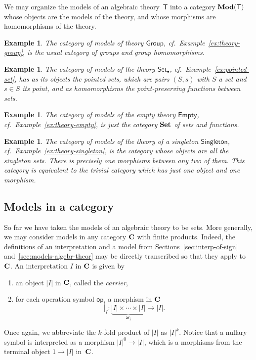 \documentclass{amsart}
\newcommand{\theory}[1]{\mathsf{#1}} %
\newcommand{\Mod}[1]{\text{\textbf{Mod}}(\theory{#1})} %
\newcommand{\category}[1]{\text{\textbf{#1}}} %
\newcommand{\op}[1]{\mathsf{op}_{#1}} %
\newcommand{\arity}[1]{\mathsf{ar}_{#1}} %
\newcommand{\one}{\mathsf{1}} %
\newcommand{\sem}[1]{[\![#1]\!]} %
\newtheorem{example}[definition]{Example}
\begin{document}
We may organize the models of an algebraic theory~$\theory{T}$ into a category $\Mod{T}$
whose objects are the models of the theory, and whose morphisms are homomorphisms of the
theory.

\begin{example}
  The category of models of theory $\theory{Group}$, cf.\ Example~\ref{ex:theory-group},
  is the usual category of groups and group homomorphisms.
\end{example}

\begin{example}
  The category of models of the theory $\theory{Set_\bullet}$, cf.\
  Example~\ref{ex:pointed-set}, has as its objects the pointed sets, which are pairs
  $(S, s)$ with $S$ a set and $s \in S$ its \emph{point}, and as homomorphisms
  the point-preserving functions between sets.
\end{example}

\begin{example}
  The category of models of the empty theory $\theory{Empty}$, cf.\
  Example~\ref{ex:theory-empty}, is just the category $\category{Set}$ of sets and
  functions.
\end{example}

\begin{example}
  The category of models of the theory of a singleton $\theory{Singleton}$, cf.\
  Example~\ref{ex:theory-singleton}, is the category whose objects are all the singleton
  sets. There is precisely one morphisms between any two of them. This category is
  equivalent to the trivial category which has just one object and one morphism.
\end{example}

\subsection{Models in a category}
\label{sec:models-category}

So far we have taken the models of an algebraic theory to be sets. More generally, we may
consider models in any category $\category{C}$ with finite products. Indeed, the
definitions of an interpretation and a model from Sections~\ref{sec:interp-of-sign}
and~\ref{sec:models-algebr-theor} may be directly transcribed so that they apply
to~$\category{C}$. An interpretation $I$ in $\category{C}$ is given by
%
\begin{enumerate}
\item an object $|I|$ in $\category{C}$, called the \emph{carrier},
\item for each operation symbol $\op{i}$ a morphism in $\category{C}$
  \begin{equation*}
    \sem{\op{i}}_I : \underbrace{|I| \times \cdots \times |I|}_{\arity{i}} \to |I|.
  \end{equation*}
\end{enumerate}
%
Once again, we abbreviate the $k$-fold product of $|I|$ as $|I|^k$. Notice that a nullary
symbol is interpreted as a morphism $|I|^0 \to |I|$, which is a morphisms from the
terminal object $\one \to |I|$ in~$\category{C}$.
\end{document}
